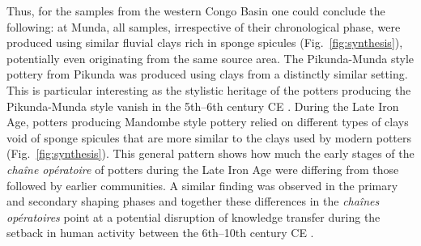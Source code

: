 \documentclass[preprint,10pt,oneside,onecolumn,authoryear]{elsarticle}
\begin{document}
Thus, for the samples from the western Congo Basin one could conclude the following: at Munda, all samples, irrespective of their chronological phase, were produced using similar fluvial clays rich in sponge spicules (Fig.~\ref{fig:synthesis}), potentially even originating from the same source area. The Pikunda-Munda style pottery from Pikunda was produced using clays from a distinctly similar setting. This is particular interesting as the stylistic heritage of the potters producing the Pikunda-Munda style vanish in the 5th--6th century CE \citep{Seidensticker.2025}. During the Late Iron Age, potters producing Mandombe style pottery relied on different types of clays void of sponge spicules that are more similar to the clays used by modern potters (Fig.~\ref{fig:synthesis}). This general pattern shows how much the early stages of the \textit{chaîne opératoire} of potters during the Late Iron Age were differing from those followed by earlier communities. A similar finding was observed in the primary and secondary shaping phases \citep{Seidensticker.2025} and together these differences in the \textit{chaînes opératoires} point at a potential disruption of knowledge transfer during the setback in human activity between the 6th--10th century CE \citep{Seidensticker.2021}.
\end{document}
